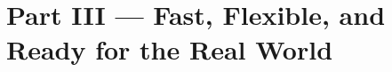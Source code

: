 \documentclass[10pt,aspectratio=169]{beamer}
\newcommand{\currentpresenter}{}
\newcommand{\setpresenter}[1]{\renewcommand{\currentpresenter}{#1}}
\begin{document}


\setpresenter{Shuvo --- Complexity, Extensions \& Applications}
\section{Part III --- Fast, Flexible, and Ready for the Real World}
\end{document}
